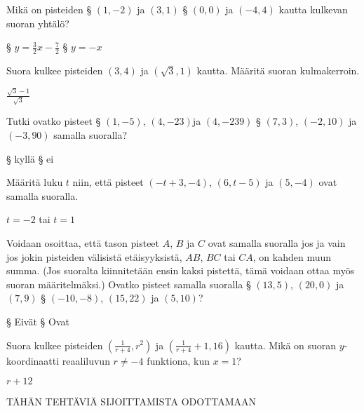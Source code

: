 \begin{tehtavasivu}
\begin{tehtava}
Mikä on pisteiden
\alakohdat
§ $(1, -2)$ ja $(3, 1)$
§ $(0, 0)$ ja $(-4, 4)$ kautta kulkevan suoran yhtälö?
\loppu
\begin{vastaus}
\alakohdat
§ $y=\frac{3}{2}x-\frac{7}{2}$
§ $y=-x$
\loppu
\end{vastaus}
\end{tehtava}

\begin {tehtava}
Suora kulkee pisteiden $(3, 4)$ ja $(\sqrt{3}, 1)$ kautta. Määritä suoran kulmakerroin.
\begin {vastaus}
$\frac{\sqrt{3}-1}{\sqrt{3}}$
\end {vastaus}
\end {tehtava}

\sarjaB %

\begin{tehtava}
Tutki ovatko pisteet  
\alakohdat
§ $(1, -5)$, $(4, -23)$ja $(4, -239)$
§ $(7, 3)$, $(-2, 10)$ ja $(-3, 90)$ samalla suoralla?
\loppu
\begin{vastaus}
\alakohdat
§ kyllä
§ ei
\loppu
\end{vastaus}
\end{tehtava}

\begin{tehtava}
Määritä luku $t$ niin, että pisteet $(-t+3, -4)$, $(6, t-5)$ ja $(5, -4)$ ovat samalla suoralla.
\begin{vastaus}
$t=-2$ tai $t=1$
\end{vastaus}
\end{tehtava}

\begin{tehtava}
Voidaan osoittaa, että tason pisteet $A$, $B$ ja $C$ ovat samalla suoralla jos ja vain jos jokin pisteiden välisistä etäisyyksistä, $AB$, $BC$ tai $CA$, on kahden muun summa. (Jos suoralta kiinnitetään ensin kaksi pistettä, tämä voidaan ottaa myös suoran määritelmäksi.) Ovatko pisteet samalla suoralla
	\alakohdat
		§ $(13,5)$, $(20,0)$ ja $(7,9)$
		§ $(-10,-8)$, $(15,22)$ ja $(5,10)$?
	\loppu
	\begin{vastaus}
		\alakohdat
			§ Eivät
			§ Ovat
		\loppu
	\end{vastaus}
\end{tehtava}

\sarjaC %

\begin{tehtava}
Suora kulkee pisteiden $(\frac{1}{r+4}, r^2)$ ja $(\frac{1}{r+4}+1, 16)$ kautta. Mikä on suoran $y$-koordinaatti reaaliluvun $r \ne -4$ funktiona, kun $x=1$?
\begin{vastaus}
$r+12$
\end{vastaus}
\end{tehtava}

\sarjaD %

TÄHÄN TEHTÄVIÄ SIJOITTAMISTA ODOTTAMAAN

\end{tehtavasivu}

